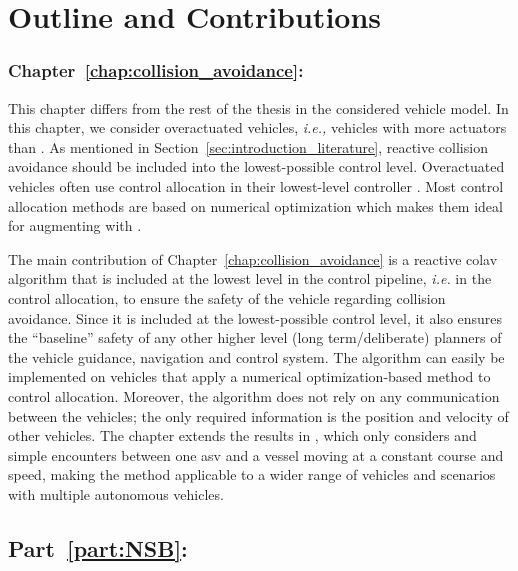 \section{Outline and Contributions}

\subsubsection{Chapter~\ref{chap:collision_avoidance}: }

This chapter differs from the rest of the thesis in the considered vehicle model.
In this chapter, we consider overactuated vehicles, \emph{i.e.,} vehicles with more actuators than .
As mentioned in Section~\ref{sec:introduction_literature}, reactive collision avoidance should be included into the lowest-possible control level.
Overactuated vehicles often use control allocation in their lowest-level controller \cite{johansen_control_2013}.
Most control allocation methods are based on numerical optimization \cite{oppenheimer_control_2006,harkegard_dynamic_2004,johansen_constrained_2004} which makes them ideal for augmenting with .

The main contribution of Chapter~\ref{chap:collision_avoidance} is a reactive \acrfull{colav} algorithm that is included at the lowest level in the control pipeline, \emph{i.e.} in the control allocation, to ensure the safety of the vehicle regarding collision avoidance.
Since it is included at the lowest-possible control level, it also ensures the ``baseline'' safety of any other higher level (long term/deliberate) planners of the vehicle guidance, navigation and control system.
The algorithm can easily be implemented on vehicles that apply a numerical optimization-based method to control allocation.
Moreover, the algorithm does not rely on any communication between the vehicles; the only required information is the position and velocity of other vehicles.
The chapter extends the results in \cite{thyri_reactive_2020}, which only considers  and simple encounters between one \gls{asv} and a vessel moving at a constant course and speed, making the method applicable to a wider range of vehicles and scenarios with multiple autonomous vehicles.

\subsection{Part~\ref{part:NSB}: }

